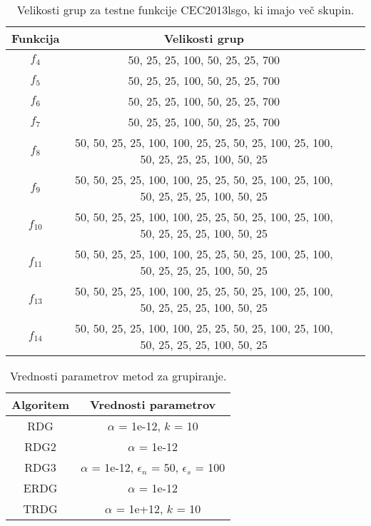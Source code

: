 \begin{table}[t]
    \renewcommand{\arraystretch}{1.3}
    \centering
    \caption{Velikosti grup za testne funkcije CEC2013lsgo, ki imajo več skupin.} \label{tab:bech:func_basic_stats_groups_no}
    \begin{tabular}{|c|c|c|c|}
        \hline
        Funkcija & Velikosti grup \\\hline
        $f_4$    & 50, 25, 25, 100, 50, 25, 25, 700 \\\hline
        $f_5$    & 50, 25, 25, 100, 50, 25, 25, 700 \\\hline
        $f_6$    & 50, 25, 25, 100, 50, 25, 25, 700 \\\hline
        $f_7$    & 50, 25, 25, 100, 50, 25, 25, 700 \\\hline
        $f_8$    & 50, 50, 25, 25, 100, 100, 25, 25, 50, 25, 100, 25, 100, 50, 25, 25, 25, 100, 50, 25 \\\hline
        $f_9$    & 50, 50, 25, 25, 100, 100, 25, 25, 50, 25, 100, 25, 100, 50, 25, 25, 25, 100, 50, 25 \\\hline
        $f_{10}$ & 50, 50, 25, 25, 100, 100, 25, 25, 50, 25, 100, 25, 100, 50, 25, 25, 25, 100, 50, 25 \\\hline
        $f_{11}$ & 50, 50, 25, 25, 100, 100, 25, 25, 50, 25, 100, 25, 100, 50, 25, 25, 25, 100, 50, 25 \\\hline
        $f_{13}$ & 50, 50, 25, 25, 100, 100, 25, 25, 50, 25, 100, 25, 100, 50, 25, 25, 25, 100, 50, 25 \\\hline
        $f_{14}$ & 50, 50, 25, 25, 100, 100, 25, 25, 50, 25, 100, 25, 100, 50, 25, 25, 25, 100, 50, 25 \\\hline
    \end{tabular}
\end{table}


\begin{table}[t]
    \renewcommand{\arraystretch}{1.3}
    \centering
    \caption{Vrednosti parametrov metod za grupiranje.} \label{tab:algs:group_params}
    \begin{tabular}{|c|c|}
        \hline
        Algoritem & Vrednosti parametrov \\\hline
        RDG  & $\alpha$ = 1e-12, $k$ = 10 \\\hline
        RDG2 & $\alpha$ = 1e-12 \\\hline
        RDG3 & $\alpha$ = 1e-12, $\epsilon_n$ = 50, $\epsilon_s$ = 100 \\\hline
        ERDG & $\alpha$ = 1e-12 \\\hline
        TRDG & $\alpha$ = 1e+12, $k$ = 10 \\\hline
    \end{tabular}
\end{table}

